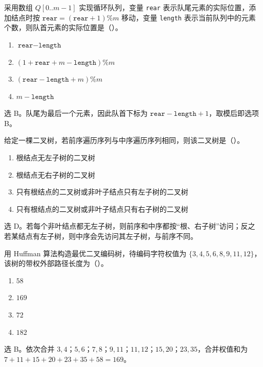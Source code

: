 \begin{question}
采用数组 $Q[0..m-1]$ 实现循环队列，变量 \texttt{rear} 表示队尾元素的实际位置，添加结点时按 $\texttt{rear}=(\texttt{rear}+1)\%m$ 移动，变量 \texttt{length} 表示当前队列中的元素个数，则队首元素的实际位置是（\quad）。
\begin{enumerate}
  \item $\texttt{rear}-\texttt{length}$
  \item $(1+\texttt{rear}+m-\texttt{length})\%m$
  \item $(\texttt{rear}-\texttt{length}+m)\%m$
  \item $m-\texttt{length}$
\end{enumerate}
\begin{solution}
选 B。队尾为最后一个元素，因此队首下标为 $\texttt{rear}-\texttt{length}+1$，取模后即选项 B。
\end{solution}
\end{question}

\begin{question}
给定一棵二叉树，若前序遍历序列与中序遍历序列相同，则该二叉树是（\quad）。
\begin{enumerate}
  \item 根结点无左子树的二叉树
  \item 根结点无右子树的二叉树
  \item 只有根结点的二叉树或非叶子结点只有左子树的二叉树
  \item 只有根结点的二叉树或非叶子结点只有右子树的二叉树
\end{enumerate}
\begin{solution}
选 D。若每个非叶结点都无左子树，则前序和中序都按“根、右子树”访问；反之若某结点有左子树，则中序会先访问其左子树，与前序不同。
\end{solution}
\end{question}

\begin{question}
用 Huffman 算法构造最优二叉编码树，待编码字符权值为 $\{3,4,5,6,8,9,11,12\}$，该树的带权外部路径长度为（\quad）。
\begin{enumerate}
  \item $58$
  \item $169$
  \item $72$
  \item $182$
\end{enumerate}
\begin{solution}
选 B。依次合并 $3,4$；$5,6$；$7,8$；$9,11$；$11,12$；$15,20$；$23,35$，合并权值和为 $7+11+15+20+23+35+58=169$。
\end{solution}
\end{question}

